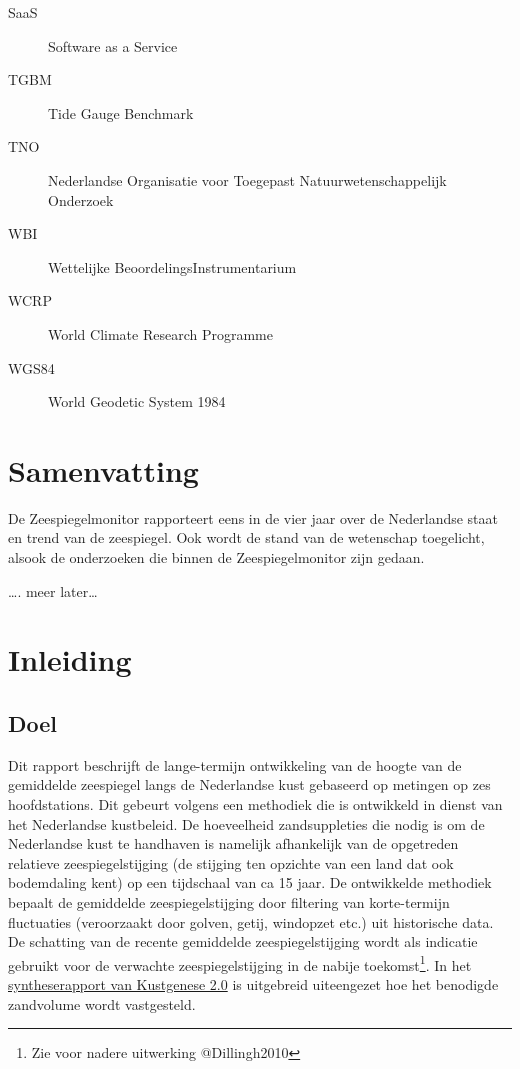 \documentclass[ddraft]{deltares_report}
\begin{document}
\begin{description}
\item[\label{acronyms_SaaS}{SaaS}]
Software as a Service
\item[\label{acronyms_TGBM}{TGBM}]
Tide Gauge Benchmark
\item[\label{acronyms_TNO}{TNO}]
Nederlandse Organisatie voor Toegepast Natuurwetenschappelijk Onderzoek
\item[\label{acronyms_WBI}{WBI}]
Wettelijke BeoordelingsInstrumentarium
\item[\label{acronyms_WCRP}{WCRP}]
World Climate Research Programme
\item[\label{acronyms_WGS84}{WGS84}]
World Geodetic System 1984
\end{description}


\chapter{Samenvatting}\label{samenvatting}

De Zeespiegelmonitor rapporteert eens in de vier jaar over de
Nederlandse staat en trend van de zeespiegel. Ook wordt de stand van de
wetenschap toegelicht, alsook de onderzoeken die binnen de
Zeespiegelmonitor zijn gedaan.

\ldots. meer later\ldots{}


\chapter{Inleiding}\label{sec-inleiding}

\section{Doel}\label{doel}

Dit rapport beschrijft de lange-termijn ontwikkeling van de hoogte van
de gemiddelde zeespiegel langs de Nederlandse kust gebaseerd op metingen
op zes hoofdstations. Dit gebeurt volgens een methodiek die is
ontwikkeld in dienst van het Nederlandse kustbeleid. De hoeveelheid
zandsuppleties die nodig is om de Nederlandse kust te handhaven is
namelijk afhankelijk van de opgetreden relatieve zeespiegelstijging (de
stijging ten opzichte van een land dat ook bodemdaling kent) op een
tijdschaal van ca 15 jaar. De ontwikkelde methodiek bepaalt de
gemiddelde zeespiegelstijging door filtering van korte-termijn
fluctuaties (veroorzaakt door golven, getij, windopzet etc.) uit
historische data. De schatting van de recente gemiddelde
zeespiegelstijging wordt als indicatie gebruikt voor de verwachte
zeespiegelstijging in de nabije toekomst\footnote{Zie voor nadere
  uitwerking @Dillingh2010}. In het
\href{https://www.helpdeskwater.nl/publish/pages/188194/170065_m2_rapport_kustgenese-2_a4_v11_digitaal.pdf}{syntheserapport
van Kustgenese 2.0} is uitgebreid uiteengezet hoe het benodigde
zandvolume wordt vastgesteld.
\end{document}
